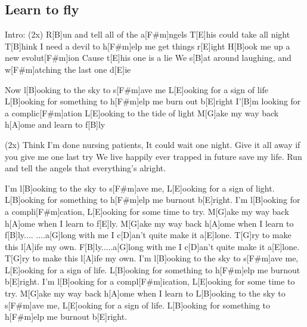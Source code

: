 \subsection*{Learn to fly   }
\begin{guitar}
Intro:  (2x)
R[B]un and tell all of the a[F#m]ngels
T[E]his could take all night
T[B]hink I need a devil to h[F#m]elp me get things r[E]ight
H[B]ook me up a new evolut[F#m]ion
Cause t[E]his one is a lie
We s[B]at around laughing, and w[F#m]atching the last one d[E]ie



Now l[B]ooking to the sky to s[F#m]ave me
L[E]ooking for a sign of life
L[B]ooking for something to h[F#m]elp me burn out b[E]right
I'[B]m looking for a complic[F#m]ation
L[E]ooking to the tide of light
M[G]ake my way back h[A]ome and learn to f[B]ly

(2x)
Think I'm done nursing patients,
It could wait one night.
Give it all away if you give me one last try
We live happily ever trapped in future save my life.
Run and tell the angels that everything's alright.



I'm l[B]ooking to the sky to s[F#m]ave me,
L[E]ooking for a sign of light.
L[B]ooking for something to h[F#m]elp me burnout b[E]right.
I'm l[B]ooking for a compli[F#m]cation,
L[E]ooking for some time to try.
M[G]ake my way back h[A]ome when I learn to f[E]ly.
M[G]ake my way back h[A]ome when I learn to f[B]ly....
....a[G]long with me I c[D]an't quite make it a[E]lone.
T[G]ry to make this l[A]ife my own.
F[B]ly.....a[G]long with me I c[D]an't quite make it a[E]lone.
T[G]ry to make this l[A]ife my own.
I'm l[B]ooking to the sky to s[F#m]ave me,
L[E]ooking for a sign of life.
L[B]ooking for something to h[F#m]elp me burnout b[E]right.
I'm l[B]ooking for a compl[F#m]ication,
L[E]ooking for some time to try.
M[G]ake my way back h[A]ome when I learn to
L[B]ooking to the sky to s[F#m]ave me,
L[E]ooking for a sign of life.
L[B]ooking for something to h[F#m]elp me burnout b[E]right.
\end{guitar}
